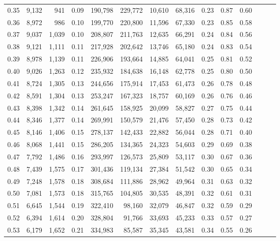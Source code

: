 \begin{tabular}{rrrrrrrrrrrrrr}
0.35 &  9,132 &    941 &  0.09 &  190,798 &  229,772 &  10,610 &  68,316 &  0.23 &  0.87 &      0.60 \\
0.36 &  8,972 &    986 &  0.10 &  199,770 &  220,800 &  11,596 &  67,330 &  0.23 &  0.85 &      0.58 \\
0.37 &  9,037 &  1,039 &  0.10 &  208,807 &  211,763 &  12,635 &  66,291 &  0.24 &  0.84 &      0.56 \\
0.38 &  9,121 &  1,111 &  0.11 &  217,928 &  202,642 &  13,746 &  65,180 &  0.24 &  0.83 &      0.54 \\
0.39 &  8,978 &  1,139 &  0.11 &  226,906 &  193,664 &  14,885 &  64,041 &  0.25 &  0.81 &      0.52 \\
0.40 &  9,026 &  1,263 &  0.12 &  235,932 &  184,638 &  16,148 &  62,778 &  0.25 &  0.80 &      0.50 \\
0.41 &  8,724 &  1,305 &  0.13 &  244,656 &  175,914 &  17,453 &  61,473 &  0.26 &  0.78 &      0.48 \\
0.42 &  8,591 &  1,304 &  0.13 &  253,247 &  167,323 &  18,757 &  60,169 &  0.26 &  0.76 &      0.46 \\
0.43 &  8,398 &  1,342 &  0.14 &  261,645 &  158,925 &  20,099 &  58,827 &  0.27 &  0.75 &      0.44 \\
0.44 &  8,346 &  1,377 &  0.14 &  269,991 &  150,579 &  21,476 &  57,450 &  0.28 &  0.73 &      0.42 \\
0.45 &  8,146 &  1,406 &  0.15 &  278,137 &  142,433 &  22,882 &  56,044 &  0.28 &  0.71 &      0.40 \\
0.46 &  8,068 &  1,441 &  0.15 &  286,205 &  134,365 &  24,323 &  54,603 &  0.29 &  0.69 &      0.38 \\
0.47 &  7,792 &  1,486 &  0.16 &  293,997 &  126,573 &  25,809 &  53,117 &  0.30 &  0.67 &      0.36 \\
0.48 &  7,439 &  1,575 &  0.17 &  301,436 &  119,134 &  27,384 &  51,542 &  0.30 &  0.65 &      0.34 \\
0.49 &  7,248 &  1,578 &  0.18 &  308,684 &  111,886 &  28,962 &  49,964 &  0.31 &  0.63 &      0.32 \\
0.50 &  7,081 &  1,573 &  0.18 &  315,765 &  104,805 &  30,535 &  48,391 &  0.32 &  0.61 &      0.31 \\
0.51 &  6,645 &  1,544 &  0.19 &  322,410 &   98,160 &  32,079 &  46,847 &  0.32 &  0.59 &      0.29 \\
0.52 &  6,394 &  1,614 &  0.20 &  328,804 &   91,766 &  33,693 &  45,233 &  0.33 &  0.57 &      0.27 \\
0.53 &  6,179 &  1,652 &  0.21 &  334,983 &   85,587 &  35,345 &  43,581 &  0.34 &  0.55 &      0.26 \\

\end{tabular}
